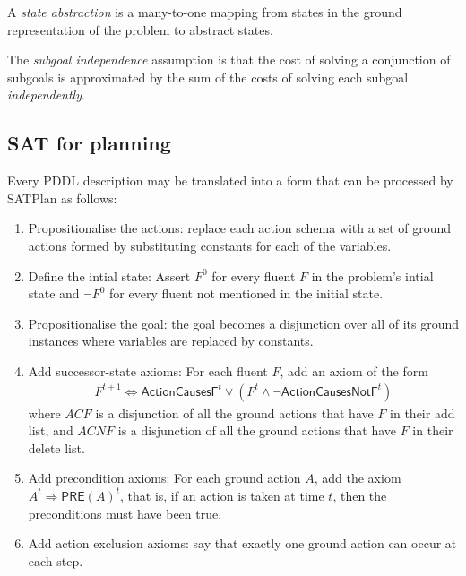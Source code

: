 \documentclass{article}
\begin{document}
\begin{definition}
    A \emph{state abstraction} is a many-to-one mapping from states in the ground
    representation of the problem to abstract states.
\end{definition}

\begin{definition}
    The \emph{subgoal independence} assumption is that the cost of solving a conjunction
    of subgoals is approximated by the sum of the costs of solving each subgoal
    \emph{independently}.
\end{definition}

\subsection{SAT for planning}

\begin{theorem}
    Every PDDL description may be translated into a form that can be
    processed by SATPlan as follows:
    \begin{enumerate}
        \item Propositionalise the actions: replace each action schema with a set of ground actions
              formed by substituting constants for each of the variables.
        \item Define the intial state: Assert $F^0$ for every fluent $F$ in the problem's intial state
              and $\neg F^0$ for every fluent not mentioned in the initial state.
        \item Propositionalise the goal: the goal becomes a disjunction over all of its ground instances
              where variables are replaced by constants.
        \item Add successor-state axioms: For each fluent $F$, add an axiom of the form \begin{align*}
            F^{t+1} \Leftrightarrow \textsf{ActionCausesF}^t \vee (F^t \wedge \neg \textsf{ActionCausesNotF}^t)
        \end{align*} 
        where $ACF$ is a disjunction of all the ground actions that have $F$ in
        their add list, and $ACNF$ is a disjunction of all the ground actions that have $F$
        in their delete list.
        \item Add precondition axioms: For each ground action $A$, add the axiom $A^t\Rightarrow\textsf{PRE}(A)^t$,
              that is, if an action is taken at time $t$, then the preconditions must have been true.
        \item Add action exclusion axioms: say that exactly one ground action can occur at each step.
    \end{enumerate}
\end{theorem}
\end{document}
